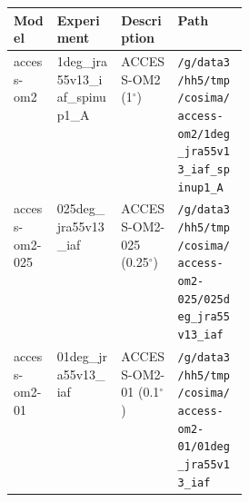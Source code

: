 
\begin{tabularx}{\linewidth}{lXXp{0.3\linewidth}}
\hline
\textbf{Model} & \textbf{Experiment} & \textbf{Description} & \textbf{Path} \\
\hline

access-om2 & 1deg_jra55v13_iaf_spinup1_A & ACCESS-OM2 (1$^\circ$) & \texttt{\slash g\slash data3\slash hh5\slash tmp\slash cosima\slash access-om2\slash 1deg_jra55v13_iaf_spinup1_A}\\
access-om2-025 & 025deg_jra55v13_iaf & ACCESS-OM2-025 (0.25$^\circ$) & \texttt{\slash g\slash data3\slash hh5\slash tmp\slash cosima\slash access-om2-025\slash 025deg_jra55v13_iaf}\\
access-om2-01 & 01deg_jra55v13_iaf & ACCESS-OM2-01 (0.1$^\circ$) & \texttt{\slash g\slash data3\slash hh5\slash tmp\slash cosima\slash access-om2-01\slash 01deg_jra55v13_iaf}\\

\hline
\hline
\end{tabularx}
